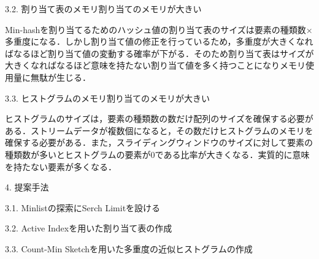 3.2. 割り当て表のメモリ割り当てのメモリが大きい

Min-hashを割り当てるためのハッシュ値の割り当て表のサイズは要素の種類数×多重度になる．しかし割り当て値の修正を行っているため，多重度が大きくなればなるほど割り当て値の変動する確率が下がる．そのため割り当て表はサイズが大きくなればなるほど意味を持たない割り当て値を多く持つことになりメモリ使用量に無駄が生じる．

3.3. ヒストグラムのメモリ割り当てのメモリが大きい

ヒストグラムのサイズは，要素の種類数の数だけ配列のサイズを確保する必要がある．ストリームデータが複数個になると，その数だけヒストグラムのメモリを確保する必要がある．また，スライディングウィンドウのサイズに対して要素の種類数が多いとヒストグラムの要素が0である比率が大きくなる．実質的に意味を持たない要素が多くなる．

4. 提案手法

3.1. Minlistの探索にSerch Limitを設ける



3.2. Active Indexを用いた割り当て表の作成

3.3. Count-Min Sketchを用いた多重度の近似ヒストグラムの作成